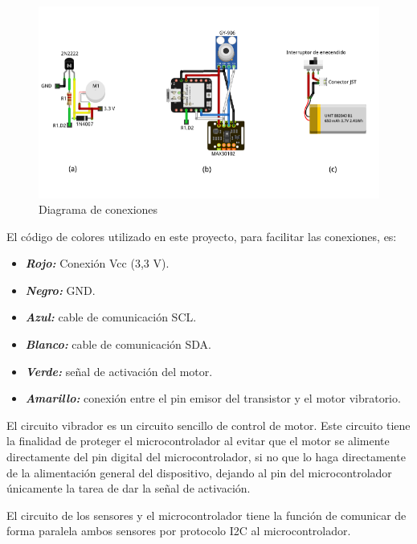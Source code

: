 \documentclass[
  letterpaper,
  DIV=11,
  numbers=noendperiod]{scrreport}
\providecommand{\tightlist}{%
  \setlength{\itemsep}{0pt}\setlength{\parskip}{0pt}}\usepackage{longtable,booktabs,array}
\begin{document}
\begin{figure}

{\centering \includegraphics{Capitulos/../Imagenes/Diagrama de conexiones.png}

}

\caption{\label{fig-conexiones}Diagrama de conexiones}

\end{figure}

El código de colores utilizado en este proyecto, para facilitar las
conexiones, es:

\begin{itemize}
\tightlist
\item
  \textbf{\emph{Rojo:}} Conexión Vcc (3,3 V).
\item
  \textbf{\emph{Negro:}} GND.
\item
  \textbf{\emph{Azul:}} cable de comunicación SCL.
\item
  \textbf{\emph{Blanco:}} cable de comunicación SDA.
\item
  \textbf{\emph{Verde:}} señal de activación del motor.
\item
  \textbf{\emph{Amarillo:}} conexión entre el pin emisor del transistor
  y el motor vibratorio.
\end{itemize}

El circuito vibrador es un circuito sencillo de control de motor. Este
circuito tiene la finalidad de proteger el microcontrolador al evitar
que el motor se alimente directamente del pin digital del
microcontrolador, si no que lo haga directamente de la alimentación
general del dispositivo, dejando al pin del microcontrolador únicamente
la tarea de dar la señal de activación.

El circuito de los sensores y el microcontrolador tiene la función de
comunicar de forma paralela ambos sensores por protocolo I2C al
microcontrolador.
\end{document}
